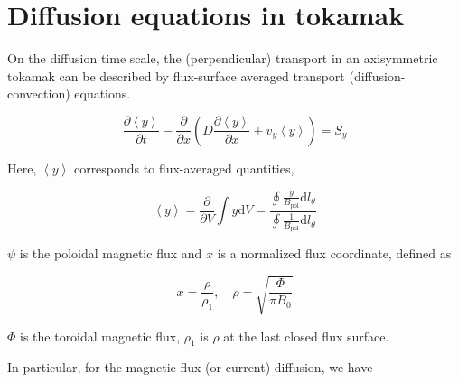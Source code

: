 \section{Diffusion equations in tokamak}

On the diffusion time scale, the (perpendicular) transport in an axisymmetric tokamak can be described by flux-surface averaged transport (diffusion-convection) equations.

\[\frac{{\partial \left\langle y \right\rangle }}{{\partial t}} - \frac{\partial }{{\partial x}}\left( {D\frac{{\partial \left\langle y \right\rangle }}{{\partial x}} + {v_y}\left\langle y \right\rangle } \right) = {S_y}\]

Here, $\left\langle y \right\rangle$ corresponds to flux-averaged quantities,

\[\left\langle y \right\rangle  = \frac{\partial }{{\partial V}}\int {y{\text{d}}V}  = \frac{{\oint {\frac{y}{{{B_{{\text{pol}}}}}}{\text{d}}{l_\theta }} }}{{\oint {\frac{1}{{{B_{{\text{pol}}}}}}{\text{d}}{l_\theta }} }}\]

$\psi$ is the poloidal magnetic flux and $x$ is a normalized flux coordinate, defined as

\[x = \frac{\rho }{{{\rho _{{\text{1}}}}}},\quad \rho  = \sqrt {\frac{\Phi }{{\pi {B_0}}}} \]

$\Phi$ is the toroidal magnetic flux, $\rho_1$ is $\rho$ at the last closed flux surface.

In particular, for the magnetic flux (or current) diffusion, we have

